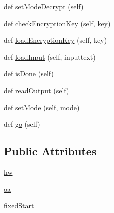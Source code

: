 \begin{DoxyCompactItemize}
\item 
def \hyperlink{classsoftware_1_1chipwhisperer_1_1capture_1_1targets_1_1SAKURAG_1_1SakuraG_a4c0400af877329b161babbe8bf061e41}{set\+Mode\+Decrypt} (self)
\item 
def \hyperlink{classsoftware_1_1chipwhisperer_1_1capture_1_1targets_1_1SAKURAG_1_1SakuraG_a7db3fcd78f30223b27cfd0a5b6e76114}{check\+Encryption\+Key} (self, key)
\item 
def \hyperlink{classsoftware_1_1chipwhisperer_1_1capture_1_1targets_1_1SAKURAG_1_1SakuraG_af7ae33d2b8ee76a52f7ab703d0a14e56}{load\+Encryption\+Key} (self, key)
\item 
def \hyperlink{classsoftware_1_1chipwhisperer_1_1capture_1_1targets_1_1SAKURAG_1_1SakuraG_af9baad1c80a6a1000748afd521f7f7d6}{load\+Input} (self, inputtext)
\item 
def \hyperlink{classsoftware_1_1chipwhisperer_1_1capture_1_1targets_1_1SAKURAG_1_1SakuraG_a4bd938ce09c55768005a3624be465143}{is\+Done} (self)
\item 
def \hyperlink{classsoftware_1_1chipwhisperer_1_1capture_1_1targets_1_1SAKURAG_1_1SakuraG_aa12dc25625e4cd27cfcbfa63f3a5f40b}{read\+Output} (self)
\item 
def \hyperlink{classsoftware_1_1chipwhisperer_1_1capture_1_1targets_1_1SAKURAG_1_1SakuraG_a8f94829d47dbf1a42b56f6c033957828}{set\+Mode} (self, mode)
\item 
def \hyperlink{classsoftware_1_1chipwhisperer_1_1capture_1_1targets_1_1SAKURAG_1_1SakuraG_aa881551defde3cf99f8f82e1765c949f}{go} (self)
\end{DoxyCompactItemize}
\subsection*{Public Attributes}
\begin{DoxyCompactItemize}
\item 
\hyperlink{classsoftware_1_1chipwhisperer_1_1capture_1_1targets_1_1SAKURAG_1_1SakuraG_acaf33f684dd48cf38734cbde5feacfe9}{hw}
\item 
\hyperlink{classsoftware_1_1chipwhisperer_1_1capture_1_1targets_1_1SAKURAG_1_1SakuraG_aad77970643e7d071044557f9619c552f}{oa}
\item 
\hyperlink{classsoftware_1_1chipwhisperer_1_1capture_1_1targets_1_1SAKURAG_1_1SakuraG_a4477c500fdbdd14a55ec9a18a4c2adfe}{fixed\+Start}
\end{DoxyCompactItemize}


